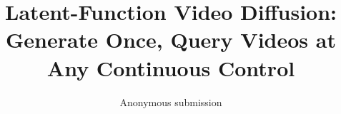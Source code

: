 \documentclass[10pt,twocolumn,letterpaper]{article}
\title{Latent-Function Video Diffusion: Generate Once, Query Videos at Any Continuous Control}
\author{Anonymous submission}
\begin{document}
\maketitle






\FloatBarrier
\clearpage

\clearpage
{\small


}
\end{document}
